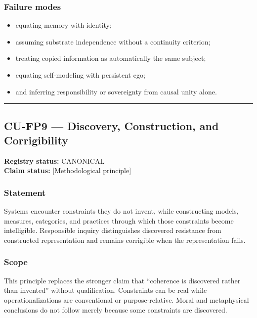 \documentclass[
  11pt,
]{article}
\providecommand{\tightlist}{%
  \setlength{\itemsep}{0pt}\setlength{\parskip}{0pt}}
\begin{document}
\subsubsection{Failure modes}\label{failure-modes-7}

\begin{itemize}
\tightlist
\item
  equating memory with identity;
\item
  assuming substrate independence without a continuity criterion;
\item
  treating copied information as automatically the same subject;
\item
  equating self-modeling with persistent ego;
\item
  and inferring responsibility or sovereignty from causal unity alone.
\end{itemize}

\begin{center}\rule{0.5\linewidth}{0.5pt}\end{center}

\subsection{CU-FP9 --- Discovery, Construction, and
Corrigibility}\label{cu-fp9-discovery-construction-and-corrigibility}

\textbf{Registry status:} CANONICAL\\
\textbf{Claim status:} {[}Methodological principle{]}

\subsubsection{Statement}\label{statement-8}

Systems encounter constraints they do not invent, while constructing
models, measures, categories, and practices through which those
constraints become intelligible. Responsible inquiry distinguishes
discovered resistance from constructed representation and remains
corrigible when the representation fails.

\subsubsection{Scope}\label{scope-7}

This principle replaces the stronger claim that ``coherence is
discovered rather than invented'' without qualification. Constraints can
be real while operationalizations are conventional or purpose-relative.
Moral and metaphysical conclusions do not follow merely because some
constraints are discovered.
\end{document}
